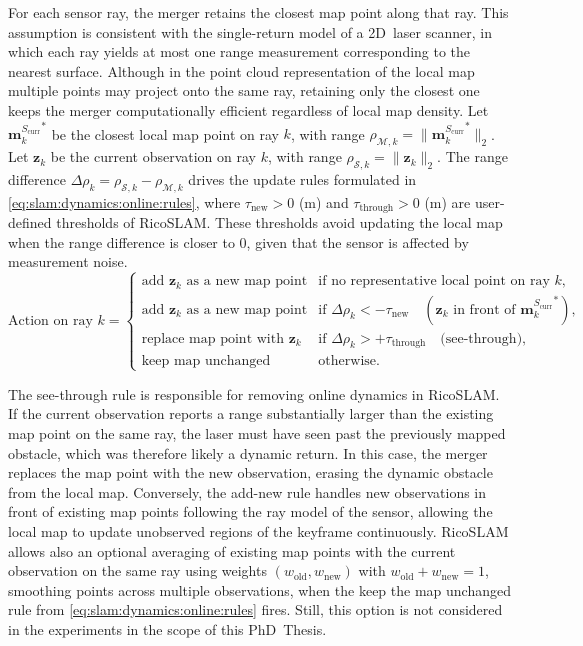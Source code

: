 For each sensor ray, the merger retains the closest map point along that ray.
This assumption is consistent with the single-return model of a 2D~laser
scanner, in which each ray yields at most one range measurement corresponding to
the nearest surface. Although in the point cloud representation of the local map
multiple points may project onto the same ray, retaining only the closest one
keeps the merger computationally efficient regardless of local map density.
Let ${\mathbf{m}^{S_{\mathrm{curr}}}_{k}}^{*}$ be the closest local map point on
ray $k$, with range
$\rho_{\mathcal{M},k} = \|{\mathbf{m}^{S_{\mathrm{curr}}}_{k}}^{*}\|_2$.
Let $\mathbf{z}_k$ be the current observation on ray $k$, with range
$\rho_{\mathcal{S},k} = \|\mathbf{z}_k\|_2$. The range
difference $\Delta\rho_k = \rho_{\mathcal{S},k} - \rho_{\mathcal{M},k}$
drives the update rules formulated in
\eqref{eq:slam:dynamics:online:rules}, where $\tau_{\mathrm{new}} > 0$ (m)
and $\tau_{\mathrm{through}} > 0$ (m) are user-defined thresholds of RicoSLAM.
These thresholds avoid updating the local map when the range difference is
closer to 0, given that the sensor is affected by measurement noise.
\begin{equation}
\label{eq:slam:dynamics:online:rules}
\text{Action on ray } k =
\begin{cases}
\text{add } \mathbf{z}_k \text{ as a new map point} &
\text{if no representative local point on ray } k,\\
\text{add } \mathbf{z}_k \text{ as a new map point} &
\text{if } \Delta\rho_k < -\tau_{\mathrm{new}}
\quad (\mathbf{z}_k \text{ in front of } {\mathbf{m}^{S_{\mathrm{curr}}}_{k}}^{*}),\\
\text{replace map point with } \mathbf{z}_k &
\text{if } \Delta\rho_k > +\tau_{\mathrm{through}}
\quad \text{(see-through)},\\
\text{keep map unchanged} &
\text{otherwise.}
\end{cases}
\end{equation}

The see-through rule is responsible for removing online dynamics in RicoSLAM.
If the current observation reports a range substantially larger than
the existing map point on the same ray, the laser must have seen past
the previously mapped obstacle, which was therefore likely a dynamic return.
In this case, the merger replaces the map point with the new observation,
erasing the dynamic obstacle from the local map.
Conversely, the add-new rule handles new observations in front of existing map
points following the ray model of the sensor, allowing the local map to update
unobserved regions of the keyframe continuously.
RicoSLAM allows also an optional averaging of existing map points with
the current observation on the same ray using weights
$(w_{\mathrm{old}}, w_{\mathrm{new}})$ with
$w_{\mathrm{old}} + w_{\mathrm{new}} = 1$, smoothing points across multiple
observations, when the keep the map unchanged rule from
\eqref{eq:slam:dynamics:online:rules} fires. Still, this option is not
considered in the experiments in the scope of this PhD~Thesis.

